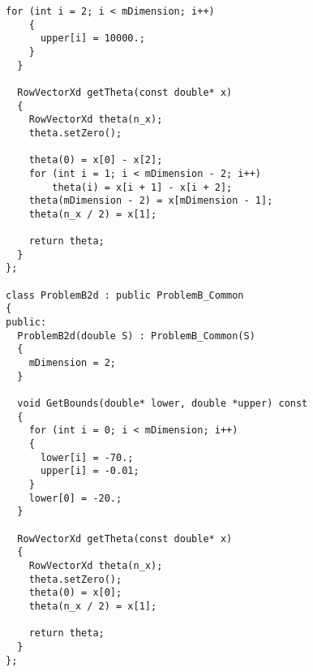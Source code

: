 \begin{lstlisting}[frame=single]
    for (int i = 2; i < mDimension; i++)
    {
      upper[i] = 10000.;
    }
  }

  RowVectorXd getTheta(const double* x)
  {
    RowVectorXd theta(n_x);
    theta.setZero();

    theta(0) = x[0] - x[2];
    for (int i = 1; i < mDimension - 2; i++)
        theta(i) = x[i + 1] - x[i + 2];
    theta(mDimension - 2) = x[mDimension - 1];
    theta(n_x / 2) = x[1];

    return theta;
  }
};

class ProblemB2d : public ProblemB_Common
{
public:
  ProblemB2d(double S) : ProblemB_Common(S)
  {
    mDimension = 2;
  }

  void GetBounds(double* lower, double *upper) const
  {
    for (int i = 0; i < mDimension; i++)
    {
      lower[i] = -70.;
      upper[i] = -0.01;
    }
    lower[0] = -20.;
  }

  RowVectorXd getTheta(const double* x)
  {
    RowVectorXd theta(n_x);
    theta.setZero();
    theta(0) = x[0];
    theta(n_x / 2) = x[1];

    return theta;
  }
};
\end{lstlisting}
